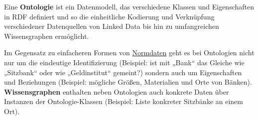 \documentclass[
  11pt,
  letterpaper,
  DIV=11,
  twoside]{scrreprt}
\begin{document}
\begin{tcolorbox}[enhanced jigsaw, leftrule=.75mm, toprule=.15mm, left=2mm, opacityback=0, arc=.35mm, colback=white, breakable, colframe=quarto-callout-important-color-frame, rightrule=.15mm, bottomrule=.15mm]
\begin{minipage}[t]{5.5mm}
\textcolor{quarto-callout-important-color}{\faExclamation}
\end{minipage}%
\begin{minipage}[t]{\textwidth - 5.5mm}

Eine \textbf{Ontologie} ist ein Datenmodell, das verschiedene Klassen
und Eigenschaften in RDF definiert und so die einheitliche Kodierung und
Verknüpfung verschiedener Datenquellen von Linked Data bis hin zu
umfangreichen Wissensgraphen ermöglicht.

Im Gegensatz zu einfacheren Formen von \hyperref[normdaten]{Normdaten}
geht es bei Ontologien nicht nur um die eindeutige Identifizierung
(Beispiel: ist mit „Bank`` das Gleiche wie „Sitzbank`` oder wie
„Geldinstitut`` gemeint?) sondern auch um Eigenschaften und Beziehungen
(Beispiel: mögliche Größen, Materialien und Orte von Bänken).
\textbf{Wissensgraphen} enthalten neben Ontologien auch konkrete Daten
über Instanzen der Ontologie-Klassen (Beispiel: Liste konkreter
Sitzbänke an einem Ort).

\end{minipage}%
\end{tcolorbox}
\end{document}
